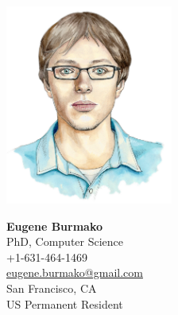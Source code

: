\documentclass[margin, 10pt]{Stylesheet}
\begin{document}
\noindent\begin{minipage}{0.4\textwidth}%
\hspace*{-1.2cm}\includegraphics[width=5.5cm]{Photo.png}
\end{minipage}%
\hfill%
\begin{minipage}{0.6\textwidth}
{\large\bf Eugene Burmako}\\
PhD, Computer Science\\
+1-631-464-1469\\
\href{mailto:eugene.burmako@gmail.com}{eugene.burmako@gmail.com}\\
San Francisco, CA\\
US Permanent Resident\\
\end{minipage}
\end{document}
